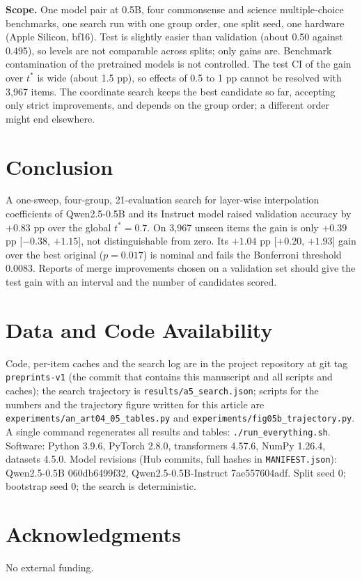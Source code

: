 \documentclass[conference]{IEEEtran}
\begin{document}
\textbf{Scope.} One model pair at 0.5B, four commonsense and science multiple-choice benchmarks, one search run with one group order, one split seed, one hardware (Apple Silicon, bf16). Test is slightly easier than validation (about 0.50 against 0.495), so levels are not comparable across splits; only gains are. Benchmark contamination of the pretrained models is not controlled. The test CI of the gain over $t^*$ is wide (about 1.5 pp), so effects of 0.5 to 1 pp cannot be resolved with 3{,}967 items. The coordinate search keeps the best candidate so far, accepting only strict improvements, and depends on the group order; a different order might end elsewhere.

\section{Conclusion}
A one-sweep, four-group, 21-evaluation search for layer-wise interpolation coefficients of Qwen2.5-0.5B and its Instruct model raised validation accuracy by $+0.83$ pp over the global $t^*=0.7$. On 3{,}967 unseen items the gain is only $+0.39$ pp [$-0.38$, $+1.15$], not distinguishable from zero. Its $+1.04$ pp [$+0.20$, $+1.93$] gain over the best original ($p=0.017$) is nominal and fails the Bonferroni threshold 0.0083. Reports of merge improvements chosen on a validation set should give the test gain with an interval and the number of candidates scored.

\section*{Data and Code Availability}
Code, per-item caches and the search log are in the project repository at git tag \texttt{preprints-v1} (the commit that contains this manuscript and all scripts and caches); the search trajectory is \texttt{results/a5\_search.json}; scripts for the numbers and the trajectory figure written for this article are \texttt{experiments/an\_art04\_05\_tables.py} and \texttt{experiments/fig05b\_trajectory.py}. A single command regenerates all results and tables: \texttt{./run\_everything.sh}. Software: Python 3.9.6, PyTorch 2.8.0, transformers 4.57.6, NumPy 1.26.4, datasets 4.5.0. Model revisions (Hub commits, full hashes in \texttt{MANIFEST.json}): Qwen2.5-0.5B 060db6499f32, Qwen2.5-0.5B-Instruct 7ae557604adf. Split seed 0; bootstrap seed 0; the search is deterministic.

\section*{Acknowledgments}
No external funding.
\end{document}

